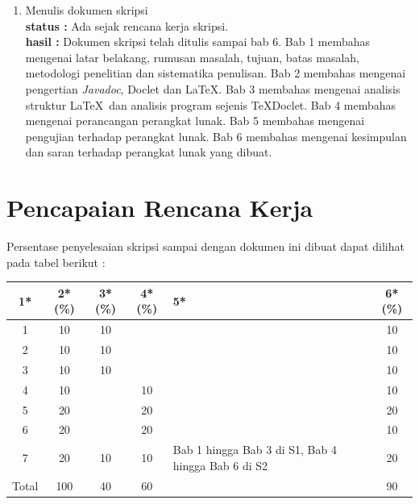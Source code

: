 \documentclass[a4paper,twoside]{article}
\begin{document}
\begin{enumerate}
\begin{lstlisting}[caption=Hasil Pengujian Kedua]
\textbf{Exception}: Tidak memiliki \textit{exception}

\end{itemize}
\end{enumerate}

\end{lstlisting}

		\item Menulis dokumen skripsi \\
		{\bf status :} Ada sejak rencana kerja skripsi.\\
		{\bf hasil :} Dokumen skripsi telah ditulis sampai bab 6. Bab 1 membahas mengenai latar belakang, rumusan masalah, tujuan, batas masalah, metodologi penelitian dan sistematika penulisan. Bab 2 membahas mengenai pengertian {\it Javadoc}, Doclet dan \LaTeX. Bab 3 membahas mengenai analisis struktur \LaTeX\ dan analisis program sejenis TeXDoclet. Bab 4 membahas mengenai perancangan perangkat lunak. Bab 5 membahas mengenai pengujian terhadap perangkat lunak. Bab 6 membahas mengenai kesimpulan dan saran terhadap perangkat lunak yang dibuat.

	\end{enumerate}

\section{Pencapaian Rencana Kerja}
Persentase penyelesaian skripsi sampai dengan dokumen ini dibuat dapat dilihat pada tabel berikut :

\begin{center}
  \begin{tabular}{ | c | c | c | c | l | c |}
    \hline
    1*  & 2*(\%) & 3*(\%) & 4*(\%) &5* &6*(\%)\\ \hline \hline
    1   & 10 & 10 &  &  & 10 \\ \hline
    2   & 10 & 10 &  &  & 10 \\ \hline
    3   & 10 & 10 &  &  & 10 \\ \hline
    4   & 10 &  & 10 &  & 10 \\ \hline
    5   & 20 &  & 20 &  & 20 \\ \hline
    6   & 20 &  & 20 &  & 10\\\hline
    7   & 20 & 10 & 10 & {\footnotesize Bab 1 hingga Bab 3 di S1, Bab 4 hingga Bab 6 di S2} & 20 \\ \hline
    Total  & 100  & 40  & 60 &  & 90\\ \hline
                          \end{tabular}
\end{center}
\end{document}
